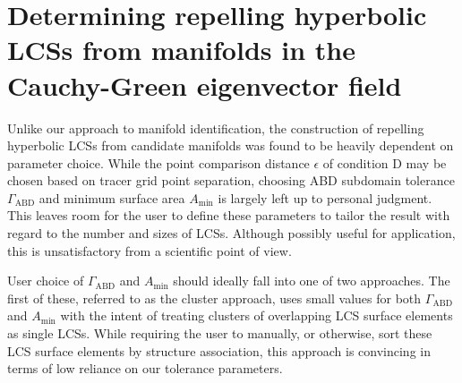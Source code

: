 




\section{Determining repelling hyperbolic LCSs from manifolds in the Cauchy-Green eigenvector field}\label{sec:discussion_selection}


Unlike our approach to manifold identification, the construction of repelling hyperbolic LCSs from candidate manifolds was found to be heavily dependent on parameter choice. While the point comparison distance $\epsilon$ of condition D may be chosen based on tracer grid point separation, choosing ABD subdomain tolerance $\Gamma_{\text{ABD}}$ and minimum surface area $A_{\text{min}}$ is largely left up to personal judgment. This leaves room for the user to define these parameters to tailor the result with regard to the number and sizes of LCSs. Although possibly useful for application, this is unsatisfactory from a scientific point of view.

User choice of $\Gamma_{\text{ABD}}$ and $A_{\text{min}}$ should ideally fall into one of two approaches. The first of these, referred to as the cluster approach, uses small values for both $\Gamma_{\text{ABD}}$ and $A_{\text{min}}$ with the intent of treating clusters of overlapping LCS surface elements as single LCSs. While requiring the user to manually, or otherwise, sort these LCS surface elements by structure association, this approach is convincing in terms of low reliance on our tolerance parameters.


